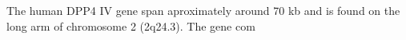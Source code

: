 The human DPP4 IV gene span aproximately around 70 kb and is found on the long arm of chromosome 2 (2q24.3). The gene com